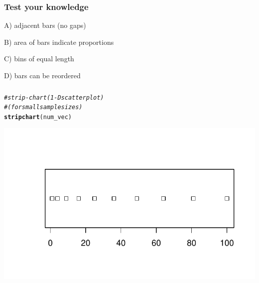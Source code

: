 \documentclass[12pt]{beamer}\usepackage[]{graphicx}\usepackage[]{color}
\makeatletter
\newcommand{\hlcom}[1]{\textcolor[rgb]{0.678,0.584,0.686}{\textit{#1}}}%
\newcommand{\hlstd}[1]{\textcolor[rgb]{0.345,0.345,0.345}{#1}}%
\newcommand{\hlkwd}[1]{\textcolor[rgb]{0.737,0.353,0.396}{\textbf{#1}}}%
\newenvironment{kframe}{%
 \def\at@end@of@kframe{}%
 \ifinner\ifhmode%
  \def\at@end@of@kframe{\end{minipage}}%
  \begin{minipage}{\columnwidth}%
 \fi\fi%
 \def\FrameCommand##1{\hskip\@totalleftmargin \hskip-\fboxsep
 \colorbox{shadecolor}{##1}\hskip-\fboxsep
     \hskip-\linewidth \hskip-\@totalleftmargin \hskip\columnwidth}%
 \MakeFramed {\advance\hsize-\width
   \@totalleftmargin\z@ \linewidth\hsize
   \@setminipage}}%
 {\par\unskip\endMakeFramed%
 \at@end@of@kframe}
\newenvironment{knitrout}{}{} %
\makeatother
\begin{document}

\begin{frame}
\frametitle{Test your knowledge}

\bbi
  \item[A)] adjacent bars (no gaps)
  \item[B)] area of bars indicate proportions
  \item[C)] bins of equal length
  \item[D)] bars can be reordered
\ei
\eb

\end{frame}


\begin{frame}[fragile]
\frametitle{}
\begin{knitrout}\footnotesize
{}\color{fgcolor}\begin{kframe}
\begin{alltt}
\hlcom{# strip-chart (1-D scatter plot)}
\hlcom{# (for small sample sizes)}
\hlkwd{stripchart}\hlstd{(num_vec)}
\end{alltt}
\end{kframe}

{\centering \includegraphics[width=.8\linewidth,height=.5\linewidth]{figure/unnamed-chunk-3-1} 

}



\end{knitrout}
\end{frame}

\end{document}
